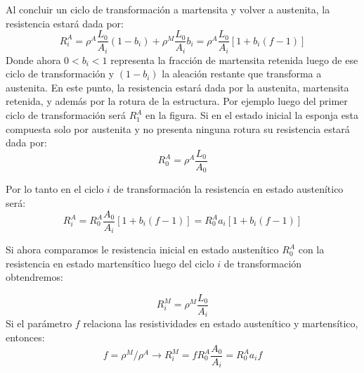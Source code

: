 \documentclass[usenames,dvipsnames]{beamer}
\begin{document}
\begin{frame}
 Al concluir un ciclo de transformación a martensita y volver a austenita, la resistencia estará dada por:
\begin{equation}
 R^A _i=\rho^A \frac{L_0}{A_i}(1-b_i) + \rho^M \frac{L_0}{A_i}b_i = \rho^A \frac{L_0}{A_i} [1+ b_i (f-1)]
\end{equation}
Donde ahora $0<b_i <1$ representa la fracción de martensita retenida luego de ese ciclo de transformación y $(1-b_ i)$ la aleación restante que transforma a austenita. En este punto, la resistencia estará dada por la austenita, martensita retenida, y además por la rotura de la estructura. Por ejemplo luego del primer ciclo de transformación será $R^A _{1}$ en la figura. 
Si en el estado inicial la esponja esta compuesta solo por austenita y no presenta ninguna rotura su resistencia estará dada por:
\begin{equation}
 R^A _0 = \rho^A \frac{L_0}{A_0}
\end{equation}
\end{frame}


\begin{frame}
Por lo tanto en el ciclo $i$ de transformación la resistencia en estado austenítico será:
\begin{equation}
 R^A _i = R^A _0 \frac{A_0}{A_i} [1+b_i (f-1)]=R^A _0 a_i [1+b_i (f-1)] \label{austenita}
\end{equation}

Si ahora comparamos le resistencia inicial en estado austenítico $R^A _0$ con la resistencia en estado martensítico luego del ciclo $i$ de transformación obtendremos:

\begin{equation}
 R^M _i = \rho ^M \frac{L_0}{A_i}
\end{equation}
Si el parámetro $f$ relaciona las resistividades en estado austenítico y martensítico, entonces:
\begin{equation}
 f=\rho^M / \rho^A \longrightarrow
 R^M _i = f R^A _0 \frac{A_0}{A_i} = R^A _0 a_i f \label{martensita}
\end{equation}

\end{frame}

\end{document}
